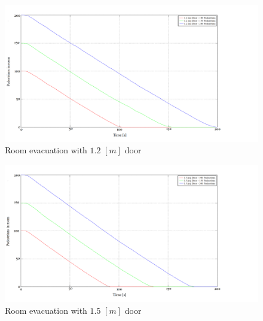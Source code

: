 \documentclass[english]{article}
\begin{document}
    \begin{figure}[H]
        \begin{centering}
        \includegraphics[scale=0.2]{pics/flow/12door} 
        \par\end{centering}
        \caption{\label{fig:room-flow-100}Room evacuation with $1.2$ $[m]$ door}
    \end{figure}
    
    \begin{figure}[H]
        \begin{centering}
        \includegraphics[scale=0.2]{pics/flow/15door} 
        \par\end{centering}
        \caption{\label{fig:room-flow-150}Room evacuation with $1.5$ $[m]$ door}
    \end{figure}
    
\end{document}

